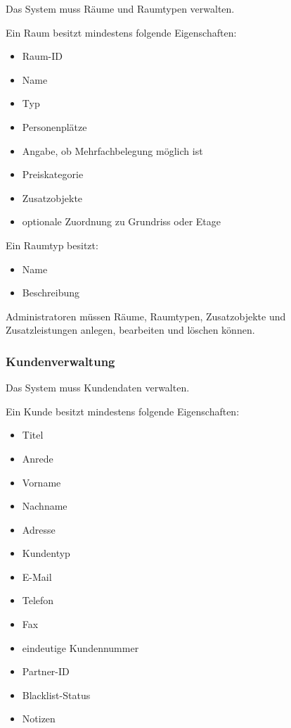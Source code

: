 Das System muss Räume und Raumtypen verwalten.

Ein Raum besitzt mindestens folgende Eigenschaften:

\begin{itemize}
\item Raum-ID
\item Name
\item Typ
\item Personenplätze
\item Angabe, ob Mehrfachbelegung möglich ist
\item Preiskategorie
\item Zusatzobjekte
\item optionale Zuordnung zu Grundriss oder Etage
\end{itemize}

Ein Raumtyp besitzt:

\begin{itemize}
\item Name
\item Beschreibung
\end{itemize}

Administratoren müssen Räume, Raumtypen, Zusatzobjekte und Zusatzleistungen anlegen, bearbeiten und löschen können.

\subsubsection{Kundenverwaltung}

Das System muss Kundendaten verwalten.

Ein Kunde besitzt mindestens folgende Eigenschaften:

\begin{itemize}
\item Titel
\item Anrede
\item Vorname
\item Nachname
\item Adresse
\item Kundentyp
\item E-Mail
\item Telefon
\item Fax
\item eindeutige Kundennummer
\item Partner-ID
\item Blacklist-Status
\item Notizen
\end{itemize}


